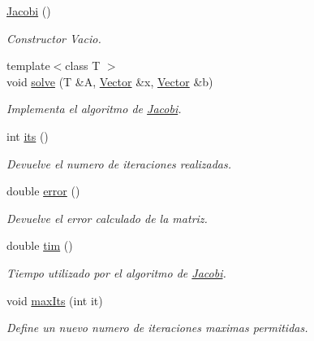 \begin{DoxyCompactItemize}
\item 
\hypertarget{class_jacobi_a95143e2bfc3d028dd72baff2e0828e40}{}\label{class_jacobi_a95143e2bfc3d028dd72baff2e0828e40} 
\hyperlink{class_jacobi_a95143e2bfc3d028dd72baff2e0828e40}{Jacobi} ()
\begin{DoxyCompactList}\small\item\em Constructor Vacio. \end{DoxyCompactList}\item 
\hypertarget{class_jacobi_aa8dec14e59b82b038b8567b333c04b3c}{}\label{class_jacobi_aa8dec14e59b82b038b8567b333c04b3c} 
{\footnotesize template$<$class T $>$ }\\void \hyperlink{class_jacobi_aa8dec14e59b82b038b8567b333c04b3c}{solve} (T \&A, \hyperlink{class_vector}{Vector} \&x, \hyperlink{class_vector}{Vector} \&b)
\begin{DoxyCompactList}\small\item\em Implementa el algoritmo de \hyperlink{class_jacobi}{Jacobi}. \end{DoxyCompactList}\item 
int \hyperlink{class_jacobi_a4370d4024aee5a3224a76e87977e1cf3}{its} ()
\begin{DoxyCompactList}\small\item\em Devuelve el numero de iteraciones realizadas. \end{DoxyCompactList}\item 
double \hyperlink{class_jacobi_aaebdc79b8c4b4637e757cbea50ffda4b}{error} ()
\begin{DoxyCompactList}\small\item\em Devuelve el error calculado de la matriz. \end{DoxyCompactList}\item 
double \hyperlink{class_jacobi_a949ec5de87b55889cb3e69400e1e50b7}{tim} ()
\begin{DoxyCompactList}\small\item\em Tiempo utilizado por el algoritmo de \hyperlink{class_jacobi}{Jacobi}. \end{DoxyCompactList}\item 
void \hyperlink{class_jacobi_a4a493cb90b3ff37d68cea02bef85929a}{max\+Its} (int it)
\begin{DoxyCompactList}\small\item\em Define un nuevo numero de iteraciones maximas permitidas. \end{DoxyCompactList}\item 

\end{DoxyCompactItemize}
